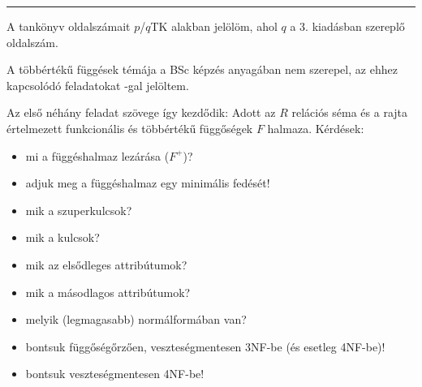 \documentclass[a5paper]{article}
\begin{document}
\begingroup\makeatletter\lowercase{\endgroup
  \def\@listi{%
    \leftmargin=\leftmargini%
    \topsep=5pt plus3pt minus1pt%
    \parsep=0.5pt plus0.5pt minus0.5pt%
    \itemsep=3pt plus3pt minus1pt%
  }%
}


\smallskip
\hrule
\smallskip

A tankönyv oldalszámait $p$/$q$TK alakban jelölöm, ahol $q$ a 3. kiadásban szereplő oldalszám.

A többértékű függések témája a BSc képzés anyagában nem szerepel, az ehhez kapcsolódó feladatokat {\bf *}-gal jelöltem.

Az első néhány feladat szövege így kezdődik: Adott az $R$ relációs séma
és a rajta értelmezett funkcionális és többértékű függőségek $F$ halmaza. Kérdések:

\begin{itemize}

\item mi a függéshalmaz lezárása ($F^+$)?
\item adjuk meg a függéshalmaz egy minimális fedését!
\item mik a szuperkulcsok?
\item mik a kulcsok?
\item mik az elsődleges attribútumok?
\item mik a másodlagos attribútumok?
\item melyik (legmagasabb) normálformában van?
\item bontsuk függőségőrzően, veszteségmentesen 3NF-be (és esetleg 4NF-be)!
\item bontsuk veszteségmentesen 4NF-be!{\bf *}

\end{itemize}


\let\toot\twoheadrightarrow
\long{}
\newlength{\csillag}
\settowidth{\csillag}{{\bf *}}
\long{}
\long{}
\end{document}
